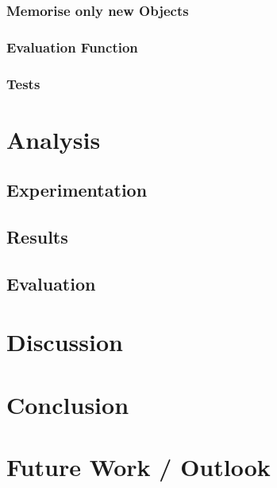 \documentclass[11pt, twoside, a4paper]{report}
\begin{document}
\subsection{Memorise only new Objects}
\subsection{Evaluation Function}
\subsection{Tests}


\chapter{Analysis}
\section{Experimentation}
\section{Results}
\section{Evaluation}


\chapter{Discussion}


\chapter{Conclusion}


\chapter{Future Work / Outlook}
\end{document}
